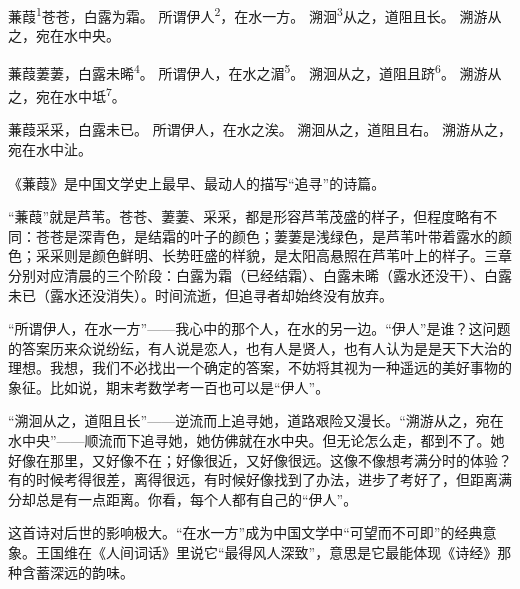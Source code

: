 
\begin{poem}
蒹葭\textsuperscript{1}苍苍，白露为霜。
所谓伊人\textsuperscript{2}，在水一方。
溯洄\textsuperscript{3}从之，道阻且长。
溯游从之，宛在水中央。

蒹葭萋萋，白露未晞\textsuperscript{4}。
所谓伊人，在水之湄\textsuperscript{5}。
溯洄从之，道阻且跻\textsuperscript{6}。
溯游从之，宛在水中坻\textsuperscript{7}。

蒹葭采采，白露未已。
所谓伊人，在水之涘。
溯洄从之，道阻且右。
溯游从之，宛在水中沚。
\end{poem}

\begin{annotations}
\end{annotations}

\begin{appreciation}
《蒹葭》是中国文学史上最早、最动人的描写“追寻”的诗篇。

“蒹葭”就是芦苇。苍苍、萋萋、采采，都是形容芦苇茂盛的样子，但程度略有不同：苍苍是深青色，是结霜的叶子的颜色；萋萋是浅绿色，是芦苇叶带着露水的颜色；采采则是颜色鲜明、长势旺盛的样貌，是太阳高悬照在芦苇叶上的样子。三章分别对应清晨的三个阶段：白露为霜（已经结霜）、白露未晞（露水还没干）、白露未已（露水还没消失）。时间流逝，但追寻者却始终没有放弃。
    
“所谓伊人，在水一方”——我心中的那个人，在水的另一边。“伊人”是谁？这问题的答案历来众说纷纭，有人说是恋人，也有人是贤人，也有人认为是是天下大治的理想。我想，我们不必找出一个确定的答案，不妨将其视为一种遥远的美好事物的象征。比如说，期末考数学考一百也可以是“伊人”。
    
“溯洄从之，道阻且长”——逆流而上追寻她，道路艰险又漫长。“溯游从之，宛在水中央”——顺流而下追寻她，她仿佛就在水中央。但无论怎么走，都到不了。她好像在那里，又好像不在；好像很近，又好像很远。这像不像想考满分时的体验？有的时候考得很差，离得很远，有时候好像找到了办法，进步了考好了，但距离满分却总是有一点距离。你看，每个人都有自己的“伊人”。
    
这首诗对后世的影响极大。“在水一方”成为中国文学中“可望而不可即”的经典意象。王国维在《人间词话》里说它“最得风人深致”，意思是它最能体现《诗经》那种含蓄深远的韵味。
\end{appreciation}

